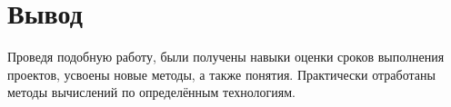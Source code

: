 \section{Вывод}
Проведя подобную работу,
были получены навыки оценки сроков выполнения проектов,
усвоены новые методы, а также понятия.
Практически отработаны методы вычислений по определённым технологиям.
